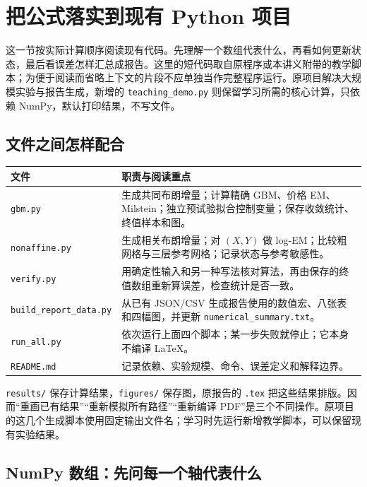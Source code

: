 \documentclass[11pt,a4paper,fontset=none]{ctexart}
\numberwithin{equation}{section}
\begin{document}
\section{把公式落实到现有 Python 项目}
\label{code:chapter}

这一节按实际计算顺序阅读现有代码。先理解一个数组代表什么，再看如何更新状态，最后看误差怎样汇总成报告。这里的短代码取自原程序或本讲义附带的教学脚本；为便于阅读而省略上下文的片段不应单独当作完整程序运行。原项目解决大规模实验与报告生成，新增的 \texttt{teaching\_demo.py} 则保留学习所需的核心计算，只依赖 NumPy，默认打印结果，不写文件。

\subsection{文件之间怎样配合}

\begin{center}
\small
\begin{tabularx}{\textwidth}{@{}lX@{}}
\toprule
文件 & 职责与阅读重点\\
\midrule
\texttt{gbm.py} & 生成共同布朗增量；计算精确 GBM、价格 EM、Milstein；独立预试验拟合控制变量；保存收敛统计、终值样本和图。\\
\texttt{nonaffine.py} & 生成相关布朗增量；对 $(X,Y)$ 做 log-EM；比较粗网格与三层参考网格；记录状态与参考敏感性。\\
\texttt{verify.py} & 用确定性输入和另一种写法核对算法，再由保存的终值数组重新算误差，检查统计是否一致。\\
\texttt{build\_report\_data.py} & 从已有 JSON/CSV 生成报告使用的数值宏、八张表和四幅图，并更新 \texttt{numerical\_summary.txt}。\\
\texttt{run\_all.py} & 依次运行上面四个脚本；某一步失败就停止；它本身不编译 \LaTeX。\\
\texttt{README.md} & 记录依赖、实验规模、命令、误差定义和解释边界。\\
\bottomrule
\end{tabularx}
\end{center}

\texttt{results/} 保存计算结果，\texttt{figures/} 保存图，原报告的 \texttt{.tex} 把这些结果排版。因而“重画已有结果”“重新模拟所有路径”“重新编译 PDF”是三个不同操作。原项目的这几个生成脚本使用固定输出文件名；学习时先运行新增教学脚本，可以保留现有实验结果。

\subsection{NumPy 数组：先问每一个轴代表什么}
\end{document}
